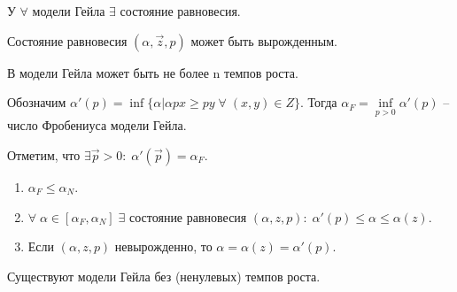 \begin{theorem}
	У $\forall$ модели Гейла $\exists$ состояние равновесия.
\end{theorem}

\begin{remark}
	Состояние равновесия $(\alpha, \vec{z}, p)$ может быть вырожденным.
\end{remark}

\begin{clair}
	В модели Гейла может быть не более n темпов роста.
\end{clair}

\begin{definition}
	Обозначим $\alpha'(p) = \inf \{ \alpha | \alpha p x  \geq p y \; \forall \; (x, y) \in Z\}.$ Тогда $\alpha_F = \underset{p > 0}{\inf}\alpha'(p)$ -- число Фробениуса модели Гейла.

	Отметим, что $\exists \vec{p} > 0: \; \alpha'(\vec{p}) = \alpha_F.$
\end{definition}

\begin{clair}
	\begin{enumerate}
		\item $\alpha_F \leq \alpha_N$.
		\item $\forall \; \alpha \in [\alpha_F, \alpha_N] \; \exists $ состояние равновесия $(\alpha, z, p): \; \alpha'(p) \leq \alpha \leq \alpha(z)$.
		\item Если $(\alpha, z, p)$ невырожденно, то $\alpha = \alpha(z) = \alpha'(p).$
	\end{enumerate}
\end{clair}

\begin{remark}
	Существуют модели Гейла без (ненулевых) темпов роста.
\end{remark}